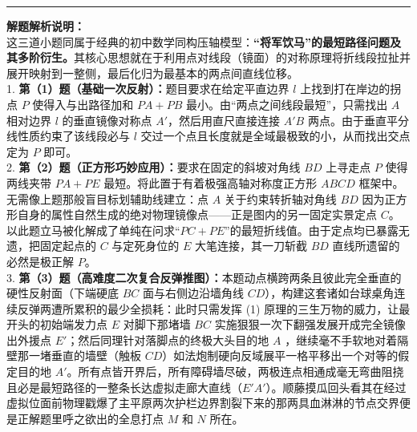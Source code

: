 \vspace{0.6cm}
\hrule
\vspace{0.4cm}

{\small\color{gray}
\textbf{解题解析说明：}\\
这三道小题同属于经典的初中数学同构压轴模型：\textbf{“将军饮马”的最短路径问题及其多阶衍生。}其核心思想就在于利用点对线段（镜面）的对称原理将折线段拉扯并展开映射到一整侧，最后化归为最基本的两点间直线位移。\\
1. \textbf{第（1）题（基础一次反射）：}题目要求在给定平直边界 $l$ 上找到打在岸边的拐点 $P$ 使得入与出路径加和 $PA+PB$ 最小。由“两点之间线段最短”，只需找出 $A$ 相对边界 $l$ 的垂直镜像对称点 $A'$，然后用直尺直接连接 $A'B$ 两点。由于垂直平分线性质约束了该线段必与 $l$ 交过一个点且长度就是全域最极致的小，从而找出交点定为 $P$ 即可。\\
2. \textbf{第（2）题（正方形巧妙应用）：}要求在固定的斜坡对角线 $BD$ 上寻走点 $P$ 使得两线夹带 $PA+PE$ 最短。将此置于有着极强高轴对称度正方形 $ABCD$ 框架中。无需像上题那般盲目标划辅助线建立：点 $A$ 关于约束转折轴对角线 $BD$ 因为正方形自身的属性自然生成的绝对物理镜像点——正是图内的另一固定实景定点 $C$。以此题立马被化解成了单纯在问求“$PC+PE$”的最短折线值。由于定点均已暴露无遗，把固定起点的 $C$ 与定死身位的 $E$ 大笔连接，其一刀斩截 $BD$ 直线所遗留的必然是极正解 $P$。\\
3. \textbf{第（3）题（高难度二次复合反弹推图）：}本题动点横跨两条且彼此完全垂直的硬性反射面（下端硬底 $BC$ 面与右侧边沿墙角线 $CD$），构建这套诸如台球桌角连续反弹两遭所累积的最少全损耗：此时只需发挥 (1) 原理的三生万物的威力，让最开头的初始端发力点 $E$ 对脚下那堵墙 $BC$ 实施狠狠一次下翻强发展开成完全镜像出外援点 $E'$；然后同理针对落脚点的终极大头目的地 $A$ ，继续毫不手软地对着隔壁那一堵垂直的墙壁（触板 $CD$）如法炮制硬向反域展平一格平移出一个对等的假定目的地 $A'$。所有点皆开界后，所有障碍墙尽破，两极连点相通成毫无弯曲阻挠且必是最短路径的一整条长达虚拟走廊大直线（$E'A'$）。顺藤摸瓜回头看其在经过虚拟位面前物理戳爆了主平原两次护栏边界割裂下来的那两具血淋淋的节点交界便是正解题里呼之欲出的全息打点 $M$ 和 $N$ 所在。
}

\vspace{0.6cm}

